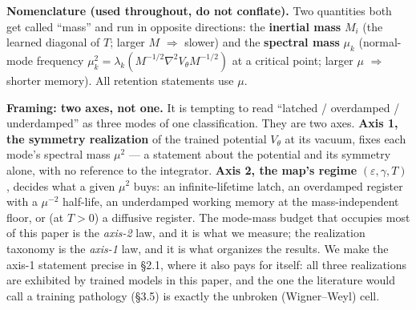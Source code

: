 \documentclass[10pt]{article}
\begin{document}
\textbf{Nomenclature (used throughout, do not conflate).} Two quantities both get called ``mass'' and run in opposite directions: the \textbf{inertial mass} $M_i$ (the learned diagonal of $T$; larger $M$ $\Rightarrow$ slower) and the \textbf{spectral mass} $\mu_k$ (normal-mode frequency $\mu_k^2=\lambda_k(M^{-1/2}\nabla^2V_\theta M^{-1/2})$ at a critical point; larger $\mu$ $\Rightarrow$ shorter memory). All retention statements use $\mu$.

\textbf{Framing: two axes, not one.} It is tempting to read ``latched / overdamped / underdamped'' as three modes of one classification. They are two axes. \textbf{Axis 1, the symmetry realization} of the trained potential $V_\theta$ at its vacuum, fixes each mode's spectral mass $\mu^2$ --- a statement about the potential and its symmetry alone, with no reference to the integrator. \textbf{Axis 2, the map's regime} $(\varepsilon,\gamma,T)$, decides what a given $\mu^2$ buys: an infinite-lifetime latch, an overdamped register with a $\mu^{-2}$ half-life, an underdamped working memory at the mass-independent floor, or (at $T>0$) a diffusive register. The mode-mass budget that occupies most of this paper is the \emph{axis-2} law, and it is what we measure; the realization taxonomy is the \emph{axis-1} law, and it is what organizes the results. We make the axis-1 statement precise in \S2.1, where it also pays for itself: all three realizations are exhibited by trained models in this paper, and the one the literature would call a training pathology (\S3.5) is exactly the unbroken (Wigner--Weyl) cell.
\end{document}
